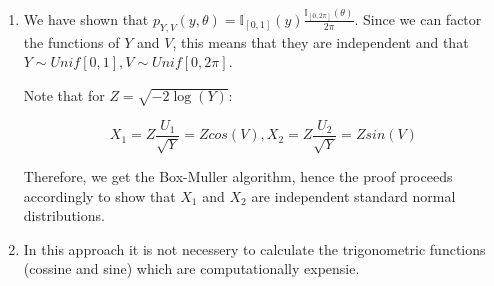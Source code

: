 \documentclass[12pt,letterpaper]{article}
\begin{document}
\begin{enumerate}[leftmargin=!,labelindent=5pt]
	\item We have shown that $p_{Y,V}(y,\theta) =
	\mathbb{I}_{[0,1]}(y)\frac{\mathbb{I}_{[0,2\pi]}(\theta)}{2\pi}$.
	Since we can factor the functions of $Y$ and $V$, this means
	that they are independent and that
	$Y \sim Unif[0,1], V \sim Unif[0,2\pi]$.

	Note that for $Z = \sqrt{-2\log(Y)}$:

	$$ X_1 = Z\frac{U_1}{\sqrt Y} = Z cos(V) , X_2
	= Z\frac{U_2}{\sqrt Y} = Z sin(V)$$

	Therefore, we get the Box-Muller algorithm, hence the proof proceeds
	accordingly to show that $X_1$ and $X_2$ are independent standard
	normal distributions.


	\item In this approach it is not necessery to calculate the 
	trigonometric functions (cossine and sine) which are computationally
	expensie.



\end{enumerate}
\end{document}
